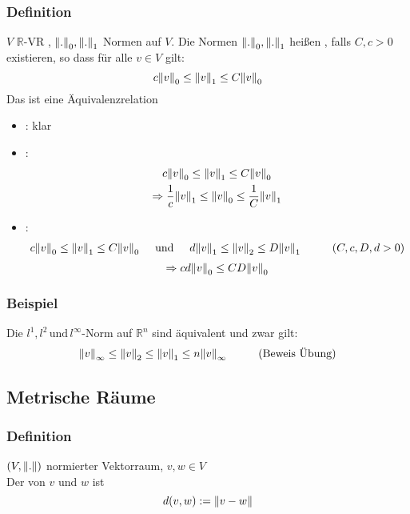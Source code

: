 \subsubsection[Äquivalenz von Normen]{Definition} %
\label{ssub:definition}
$ V$ $\mathbb{R}$-VR , $\norm{.}_0 , \norm{.}_1$ Normen auf $ V$. Die Normen $\norm{.}_0 , \norm{.}_1$ heißen , falls $C,c>0$ existieren, so dass für alle $v \in  V$ gilt:
\[
	c \norm{v}_0 \leq \norm{v}_1 \leq C \norm{v}_0 
\] 
 Das ist eine Äquivalenzrelation
\begin{itemize}
	\item {}: klar
	\item {}: \begin{gather*}
		c \norm{v}_0 \leq \norm{v}_1 \leq C \norm{v}_0 \\
		\Rightarrow \frac{1}{c} \norm{v}_1 \leq \norm{v}_0 \leq \frac{1}{C} \norm{v}_1
	\end{gather*}
	\item {}: \begin{gather*}
		c \norm{v}_0 \leq \norm{v}_1 \leq C \norm{v}_0 \hspace{0.5cm} \text{und}\hspace{0.5cm} d \norm{v}_1 \leq \norm{v}_2 \leq D \norm{v}_1  \hspace{1cm} (C,c,D,d > 0)	\end{gather*}
		\[
		\Rightarrow cd \norm{v}_0 \leq CD \norm{v}_0
		\]
\end{itemize}

\subsubsection[Beispiel Äquivalente Normen]{Beispiel} %
\label{ssub:beispiel}
Die $l^1, l^2 \, \text{und} \, l^{\infty}$-Norm auf $\mathbb{R}^n $ sind äquivalent und zwar gilt:
\[
	\norm{v}_{\infty} \leq \norm{v}_2 \leq \norm{v}_1 \leq n \norm{v}_{\infty} \hspace{1cm} \text{(Beweis Übung)}
\]

\subsection{Metrische Räume} %
\label{sub:metrische_raume}

\subsubsection[Abstand]{Definition} %
\label{ssub:definition}
$(V,\norm{.})$ normierter Vektorraum, $v,w \in  V$ \\
Der  von $v$ und $w$ ist \[
d(v,w):= \norm{v-w}	
\] 
